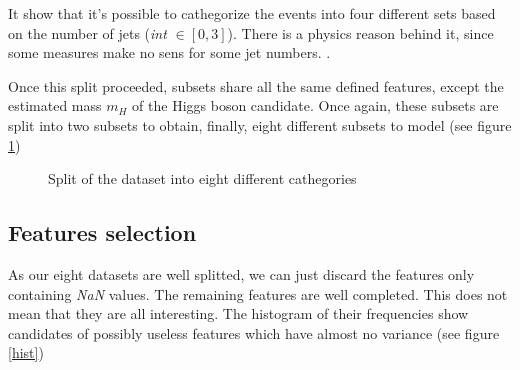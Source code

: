 \documentclass[10pt,conference,compsocconf]{IEEEtran}
\begin{document}
It show that it's possible to cathegorize the events into four different sets based on the number of jets (\emph{int} $\in [0, 3]$). There is a physics reason behind it, since some measures make no sens for some jet numbers. \cite{higgsChallenge}.

Once this split proceeded, subsets share all the same defined features, except the estimated mass $m_H$ of the Higgs boson candidate. Once again, these subsets are split into two subsets to obtain, finally, eight different subsets to model (see figure \ref{split})

\begin{figure}[tbp] %
  \centering
  \caption{Split of the dataset into eight different cathegories}
  \vspace{-3mm}
  \label{split}
\end{figure}

\subsection{Features selection}
As our eight datasets are well splitted, we can just discard the features only containing \emph{NaN} values. The remaining features are well completed. This does not mean that they are all interesting. The histogram of their frequencies show candidates of possibly useless features which have almost no variance (see figure \ref{hist})
\end{document}
